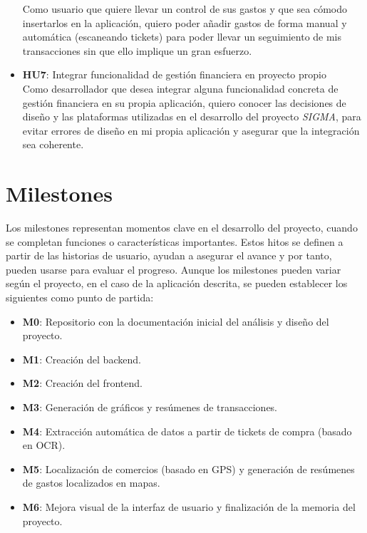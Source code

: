 \begin{itemize}
    Como usuario que quiere llevar un control de sus gastos y que sea cómodo insertarlos en la aplicación, quiero poder añadir gastos de forma manual y automática (escaneando tickets) para poder llevar un seguimiento de mis transacciones sin que ello implique un gran esfuerzo.
    \item \textbf{HU7}: Integrar funcionalidad de gestión financiera en proyecto propio\\
    Como desarrollador que desea integrar alguna funcionalidad concreta de gestión financiera en su propia aplicación, quiero conocer las decisiones de diseño y las plataformas utilizadas en el desarrollo del proyecto \textit{SIGMA}, para evitar errores de diseño en mi propia aplicación y asegurar que la integración sea coherente.
    
\end{itemize}

\section{Milestones}\label{sec:milestones}    
Los milestones representan momentos clave en el desarrollo del proyecto, cuando se completan funciones o características importantes. Estos hitos se definen a partir de las historias de usuario, ayudan a asegurar el avance y por tanto, pueden usarse para evaluar el progreso. Aunque los milestones pueden variar según el proyecto, en el caso de la aplicación descrita, se pueden establecer los siguientes como punto de partida:

\begin{itemize}
    \item \textbf{M0}: Repositorio con la documentación inicial del análisis y diseño del proyecto.
    \item \textbf{M1}: Creación del backend.
    \item \textbf{M2}: Creación del frontend.
    \item \textbf{M3}: Generación de gráficos y resúmenes de transacciones.
    \item \textbf{M4}: Extracción automática de datos a partir de tickets de compra (basado en OCR).
    \item \textbf{M5}: Localización de comercios (basado en GPS) y generación de resúmenes de gastos localizados en mapas.
    \item \textbf{M6}: Mejora visual de la interfaz de usuario y finalización de la memoria del proyecto.
\end{itemize}